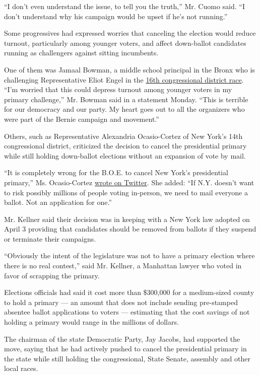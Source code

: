 ``I don't even understand the issue, to tell you the truth,'' Mr. Cuomo
said. ``I don't understand why his campaign would be upset if he's not
running.''

Some progressives had expressed worries that canceling the election
would reduce turnout, particularly among younger voters, and affect
down-ballot candidates running as challengers against sitting
incumbents.

One of them was Jamaal Bowman, a middle school principal in the Bronx
who is challenging Representative Eliot Engel in the
\href{https://www.nytimes3xbfgragh.onion/2019/06/18/us/politics/jamaal-bowman-eliot-engel.html}{16th
congressional district race}. ``I'm worried that this could depress
turnout among younger voters in my primary challenge,'' Mr. Bowman said
in a statement Monday. ``This is terrible for our democracy and our
party. My heart goes out to all the organizers who were part of the
Bernie campaign and movement.''

Others, such as Representative Alexandria Ocasio-Cortez of New York's
14th congressional district, criticized the decision to cancel the
presidential primary while still holding down-ballot elections without
an expansion of vote by mail.

``It is completely wrong for the B.O.E. to cancel New York's
presidential primary,'' Ms. Ocasio-Cortez
\href{https://twitter.com/AOC/status/1254829322352893955}{wrote on
Twitter}. She added: ``If N.Y. doesn't want to risk possibly millions of
people voting in-person, we need to mail everyone a ballot. Not an
application for one.''

Mr. Kellner said their decision was in keeping with a New York law
adopted on April 3 providing that candidates should be removed from
ballots if they suspend or terminate their campaigns.

``Obviously the intent of the legislature was not to have a primary
election where there is no real contest,'' said Mr. Kellner, a Manhattan
lawyer who voted in favor of scrapping the primary.

Elections officials had said it cost more than \$300,000 for a
medium-sized county to hold a primary --- an amount that does not
include sending pre-stamped absentee ballot applications to voters ---
estimating that the cost savings of not holding a primary would range in
the millions of dollars.

The chairman of the state Democratic Party, Jay Jacobs, had supported
the move, saying that he had actively pushed to cancel the presidential
primary in the state while still holding the congressional, State
Senate, assembly and other local races.

